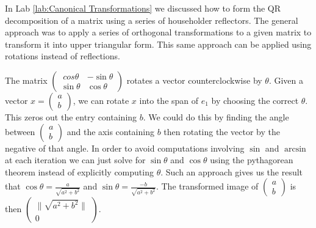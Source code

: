 
In Lab \ref{lab:Canonical Transformations} we discussed how to form the QR decomposition of a matrix using a series of householder reflectors.
The general approach was to apply a series of orthogonal transformations to a given matrix to transform it into upper triangular form.
This same approach can be applied using rotations instead of reflections.

The matrix $\begin{pmatrix}\ cos \theta & - \sin \theta \\ \sin \theta & \cos \theta \end{pmatrix}$ rotates a vector counterclockwise by $\theta$.
Given a vector $x = \begin{pmatrix} a \\ b \end{pmatrix}$, we can rotate $x$ into the span of $e_1$ by choosing the correct $\theta$.
This zeros out the entry containing $b$.
We could do this by finding the angle between $\begin{pmatrix} a \\ b \end{pmatrix}$ and the axis containing $b$ then rotating the vector by the negative of that angle.
In order to avoid computations involving $\sin$ and $\arcsin$ at each iteration we can just solve for $\sin \theta $ and $\cos \theta$ using the pythagorean theorem instead of explicitly computing $\theta$.
Such an approach gives us the result that $\cos \theta = \frac{a}{\sqrt{a^2 + b^2}}$ and $\sin \theta = \frac{- b}{\sqrt{a^2 + b^2}}$.
The transformed image of $\begin{pmatrix} a \\ b \end{pmatrix}$ is then $\begin{pmatrix} \| \sqrt{a^2 + b^2} \| \\ 0 \end{pmatrix}$.


